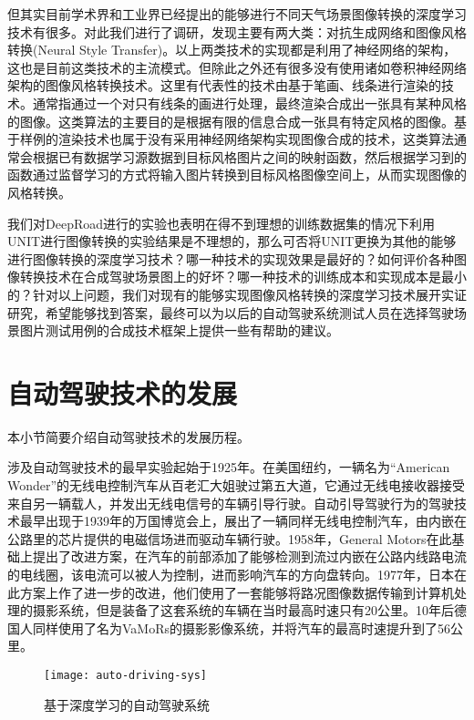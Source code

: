 但其实目前学术界和工业界已经提出的能够进行不同天气场景图像转换的深度学习技术有很多。对此我们进行了调研，发现主要有两大类：对抗生成网络和图像风格转换(Neural Style Transfer)。以上两类技术的实现都是利用了神经网络的架构，这也是目前这类技术的主流模式。但除此之外还有很多没有使用诸如卷积神经网络架构的图像风格转换技术。这里有代表性的技术由基于笔画、线条进行渲染的技术。通常指通过一个对只有线条的画进行处理，最终渲染合成出一张具有某种风格的图像。这类算法的主要目的是根据有限的信息合成一张具有特定风格的图像。基于样例的渲染技术也属于没有采用神经网络架构实现图像合成的技术，这类算法通常会根据已有数据学习源数据到目标风格图片之间的映射函数，然后根据学习到的函数通过监督学习的方式将输入图片转换到目标风格图像空间上，从而实现图像的风格转换。

我们对DeepRoad进行的实验也表明在得不到理想的训练数据集的情况下利用UNIT进行图像转换的实验结果是不理想的，那么可否将UNIT更换为其他的能够进行图像转换的深度学习技术？哪一种技术的实现效果是最好的？如何评价各种图像转换技术在合成驾驶场景图上的好坏？哪一种技术的训练成本和实现成本是最小的？针对以上问题，我们对现有的能够实现图像风格转换的深度学习技术展开实证研究，希望能够找到答案，最终可以为以后的自动驾驶系统测试人员在选择驾驶场景图片测试用例的合成技术框架上提供一些有帮助的建议。


\section{自动驾驶技术的发展}

本小节简要介绍自动驾驶技术的发展历程。

涉及自动驾驶技术的最早实验起始于1925年\cite{auto-driving-history}。在美国纽约，一辆名为“American Wonder”的无线电控制汽车从百老汇大姐驶过第五大道，它通过无线电接收器接受来自另一辆载人，并发出无线电信号的车辆引导行驶。自动引导驾驶行为的驾驶技术最早出现于1939年的万国博览会上，展出了一辆同样无线电控制汽车，由内嵌在公路里的芯片提供的电磁信场进而驱动车辆行驶。1958年，General Motors在此基础上提出了改进方案，在汽车的前部添加了能够检测到流过内嵌在公路内线路电流的电线圈，该电流可以被人为控制，进而影响汽车的方向盘转向。1977年，日本在此方案上作了进一步的改进，他们使用了一套能够将路况图像数据传输到计算机处理的摄影系统，但是装备了这套系统的车辆在当时最高时速只有20公里。10年后德国人同样使用了名为VaMoRs的摄影影像系统，并将汽车的最高时速提升到了56公里。 

\begin{figure}[ht]
    \centering
    \texttt{[image: auto-driving-sys]}
    \caption{基于深度学习的自动驾驶系统}
    \label{auto-driving-sys}
\end{figure}

